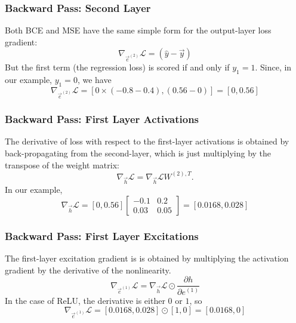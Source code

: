 \documentclass{beamer}
\begin{document}
\begin{frame}
  \frametitle{Backward Pass: Second Layer}

  Both BCE and MSE have the same simple form for the output-layer loss
  gradient:
  \begin{displaymath}
    \nabla_{\vec{e}^{(2)}}{\mathcal L}=
    \left(\hat{y}-\vec{y}\right)
  \end{displaymath}
  But the first term (the regression loss) is scored if and only if
  $y_1=1$.  Since, in our example, $y_1=0$, we have
  \begin{displaymath}
    \nabla_{\vec{e}^{(2)}}{\mathcal L}
    = [0\times(-0.8-0.4), (0.56-0)]=[0, 0.56]
  \end{displaymath}
\end{frame}

\begin{frame}
  \frametitle{Backward Pass: First Layer Activations}

  The derivative of loss with respect to the first-layer activations
  is obtained by back-propagating from the second-layer, which is just
  multiplying by the transpose of the weight matrix:
  \begin{displaymath}
    \nabla_{\vec{h}}{\mathcal L}=
    \nabla_{\vec{h}}{\mathcal L}W^{(2),T}.
  \end{displaymath}
  In our example,
  \begin{displaymath}
    \nabla_{\vec{h}}{\mathcal L}=    
          [0,0.56]\left[\begin{array}{cc}-0.1&0.2\\0.03&0.05\end{array}\right]    =
          [0.0168,0.028]
  \end{displaymath}
\end{frame}

\begin{frame}
  \frametitle{Backward Pass: First Layer Excitations}

  The first-layer excitation gradient is is obtained by multiplying
  the activation gradient by the derivative of the nonlinearity.  
  \begin{displaymath}
    \nabla_{\vec{e}^{(1)}}{\mathcal L}=
    \nabla_{\vec{h}}{\mathcal L}\odot \frac{\partial h}{\partial e^{(1)}}
  \end{displaymath}
  In the case of ReLU, the derivative is either $0$ or $1$, so
  \begin{displaymath}
    \nabla_{\vec{e}^{(1)}}{\mathcal L}=    
          [0.0168,0.028] \odot [1,0] = 
          [0.0168,0]
  \end{displaymath}
\end{frame}
\end{document}
